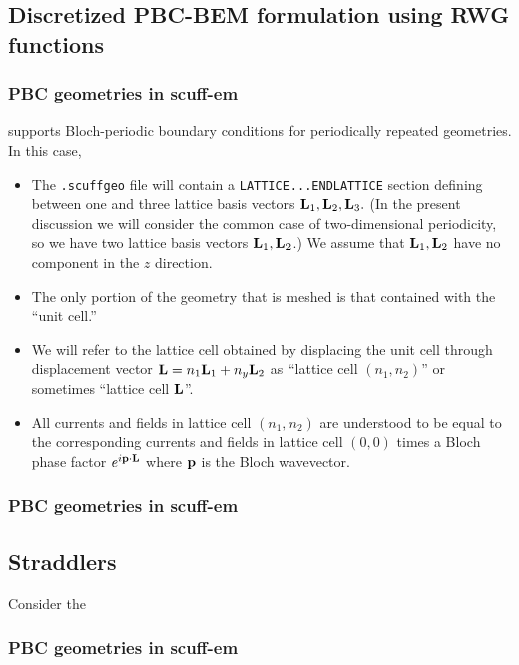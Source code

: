 \documentclass[letterpaper]{article}
\begin{document}
\subsection{Discretized PBC-BEM formulation using RWG functions}

\subsubsection{PBC geometries in {\sc scuff-em}}

\lss supports Bloch-periodic boundary conditions for
periodically repeated geometries. In this case,

\begin{itemize}
 \item The \texttt{.scuffgeo} file will contain
       a \texttt{LATTICE...ENDLATTICE} section defining 
       between one and three lattice basis vectors 
       $\mathbf{L}_1, \mathbf{L}_2, \mathbf{L}_3.$ (In the present 
       discussion we will consider the common case
       of two-dimensional periodicity, so we have two
       lattice basis vectors $\mathbf{L}_1, \mathbf{L}_2$.) 
       We assume that $\mathbf{L}_1, \mathbf{L}_2$ have no 
       component in the $z$ direction.
 \item The only portion of the geometry that is
       meshed is that contained with the ``unit cell.''
 \item We will refer to the lattice cell obtained by 
       displacing the unit cell through displacement 
       vector $\mathbf{L}=n_1 \mathbf{L}_1 + n_y \mathbf{L}_2$ as 
       ``lattice cell $(n_1, n_2)$'' or sometimes
       ``lattice cell $\mathbf{L}$''.
 \item All currents and fields in lattice cell $(n_1,n_2)$
       are understood to be equal to the corresponding
       currents and fields in lattice cell $(0,0)$ times
       a Bloch phase factor $e^{i\mathbf{p}\cdot \mathbf{L}}$ where
       $\mathbf{p}$ is the Bloch wavevector.
\end{itemize}

\subsubsection{PBC geometries in {\sc scuff-em}}

\subsection{Straddlers}

Consider the

\subsubsection{PBC geometries in {\sc scuff-em}}
\end{document}
